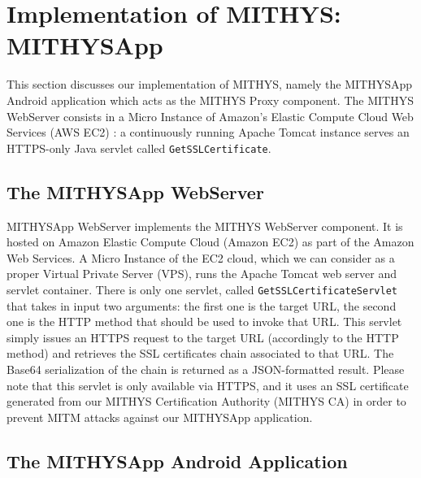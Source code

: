 \documentclass[english]{llncs}
\begin{document}
\section{Implementation of MITHYS: MITHYSApp}
\label{Implementation of MITHYS}

This section discusses our implementation of MITHYS, namely the MITHYSApp Android application which acts as the MITHYS Proxy component. The MITHYS WebServer consists in a Micro Instance of Amazon's Elastic Compute Cloud Web Services (AWS EC2) \cite{amazon_ec2}: a continuously running Apache Tomcat instance serves an HTTPS-only Java servlet called \verb+GetSSLCertificate+.

\subsection{The MITHYSApp WebServer}
\label{The MITHYSApp WebServer}

MITHYSApp WebServer implements the MITHYS WebServer component. It is hosted on Amazon Elastic Compute Cloud (Amazon EC2) \cite{amazon_ec2} as part of the Amazon Web Services. A Micro Instance of the EC2 cloud, which we can consider as a proper Virtual Private Server (VPS), runs the Apache Tomcat web server and servlet container. There is only one servlet, called \verb+GetSSLCertificateServlet+ that takes in input two arguments: the first one is the target URL, the second one is the HTTP method that should be used to invoke that URL. This servlet simply issues an HTTPS request to the target URL (accordingly to the HTTP method) and retrieves the SSL certificates chain associated to that URL. The Base64 serialization of the chain is returned as a JSON-formatted result. Please note that this servlet is only available via HTTPS, and it uses an SSL certificate generated from our MITHYS Certification Authority (MITHYS CA) in order to prevent MITM attacks against our MITHYSApp application.

\subsection{The MITHYSApp Android Application}
\label{The MITHYSApp Android Application}
\end{document}

